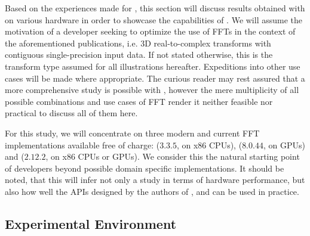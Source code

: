 Based on the experiences made for \cite{preibisch2014efficient, schmid2015real}, this section will discuss results obtained with \gearshifft{} on various hardware in order to showcase the capabilities of \gearshifft{}. We will assume the motivation of a developer seeking to optimize the use of FFTs in the context of the aforementioned publications, i.e. 3D real-to-complex transforms with contiguous single-precision input data. If not stated otherwise, this is the transform type assumed for all illustrations hereafter. 
%
Expeditions into other use cases will be made where appropriate. The curious reader may rest assured that a more comprehensive study is possible with \gearshifft{}, however the mere multiplicity of all possible combinations and use cases of FFT render it neither feasible nor practical to discuss all of them here.

For this study, we will concentrate on three modern and current FFT implementations available free of charge: \fftw{} ($3.3.5$, on x86 CPUs), \cufft{} ($8.0.44$, on \nvidia{} GPUs) and \clfft{} ($2.12.2$, on x86 CPUs or \nvidia{} GPUs). We consider this the natural starting point of developers beyond possible domain specific implementations. It should be noted, that this will infer not only a study in terms of hardware performance, but also how well the APIs designed by the authors of \fftw{}, \clfft{} and \cufft{} can be used in practice. 

\subsection{Experimental Environment}
\label{ssec:env}

